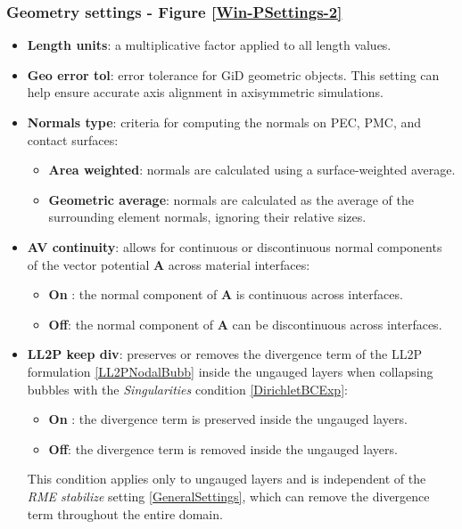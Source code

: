 \subsubsection{Geometry settings - Figure \ref{Win-PSettings-2}}

\begin{itemize}\itemsep0.25em 
	\item \textbf{Length units}: a multiplicative factor applied to all length values.
	\quad
	\item \textbf{Geo error tol}: error tolerance for GiD geometric objects. This setting can help ensure accurate axis alignment in axisymmetric simulations.
	\quad
	\item \textbf{Normals type}: criteria for computing the normals on PEC, PMC, and contact surfaces:
    \begin{itemize}\itemsep0em 
	    \item \textbf{Area weighted}: normals are calculated using a surface-weighted average.
	    \item \textbf{Geometric average}: normals are calculated as the average of the surrounding element normals, ignoring their relative sizes.
    \end{itemize}	
    \quad
	\item \textbf{AV continuity}: allows for continuous or discontinuous normal components of the vector potential \textbf{A} across material interfaces:
	\begin{itemize}\itemsep0em 
		\item \textbf{On }: the normal component of \textbf{A} is continuous across interfaces.
		\item \textbf{Off}: the normal component of \textbf{A} can be discontinuous across interfaces.
	\end{itemize}
    \quad
	\item \textbf{LL2P keep div}: preserves or removes the divergence term of the LL2P formulation \ref{LL2PNodalBubb} inside the ungauged layers when collapsing bubbles with the \textit{Singularities} condition \ref{DirichletBCExp}:
	\begin{itemize}\itemsep0em 
		\item \textbf{On }: the divergence term is preserved inside the ungauged layers.
		\item \textbf{Off}: the divergence term is removed inside the ungauged layers.
	\end{itemize}
	This condition applies only to ungauged layers and is independent of the \emph{RME stabilize} setting \ref{GeneralSettings}, which can remove the divergence term throughout the entire domain.

\end{itemize}

